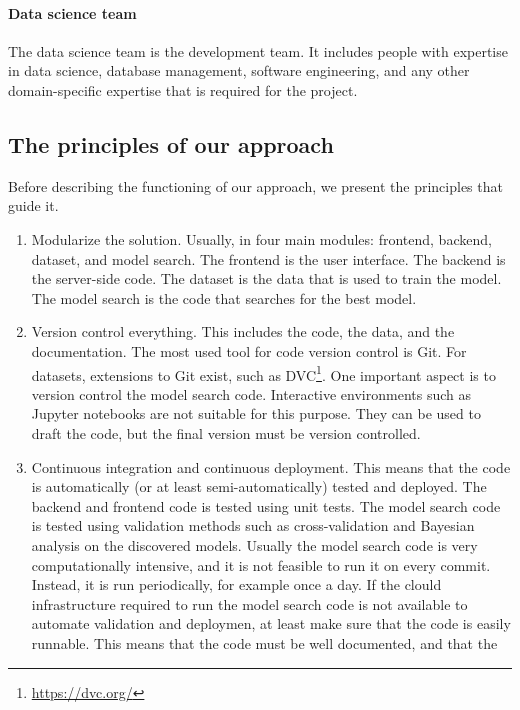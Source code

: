 \paragraph{Data science team}  The data science team is the development team.  It includes
people with expertise in data science, database management, software engineering, and any
other domain-specific expertise that is required for the project.

\subsection{The principles of our approach}

Before describing the functioning of our approach, we present the principles that guide it.

\begin{enumerate}
  \item Modularize the solution. Usually, in four main modules: frontend, backend,
    dataset, and model search.  The frontend is the user interface.  The backend is the
    server-side code.  The dataset is the data that is used to train the model.  The model
    search is the code that searches for the best model.
  \item Version control everything.  This includes the code, the data, and the
    documentation. The most used tool for code version control is Git.  For datasets,
    extensions to Git exist, such as DVC\footnote{\url{https://dvc.org/}}.  One important aspect
    is to version control the model search code.  Interactive environments such as Jupyter
    notebooks are not suitable for this purpose.  They can be used to draft the code, but
    the final version must be version controlled.
  \item Continuous integration and continuous deployment.  This means that the code is
    automatically (or at least semi-automatically) tested and deployed.  The backend and
    frontend code is tested using unit tests.  The model search code is tested using
    validation methods such as cross-validation and Bayesian analysis on the discovered
    models.  Usually the model search code is very computationally intensive, and it is
    not feasible to run it on every commit.  Instead, it is run periodically, for example
    once a day.  If the clould infrastructure required to run the model search code is not
    available to automate validation and deploymen, at least make sure that the code is
    easily runnable.  This means that the code must be well documented, and that the

\end{enumerate}

